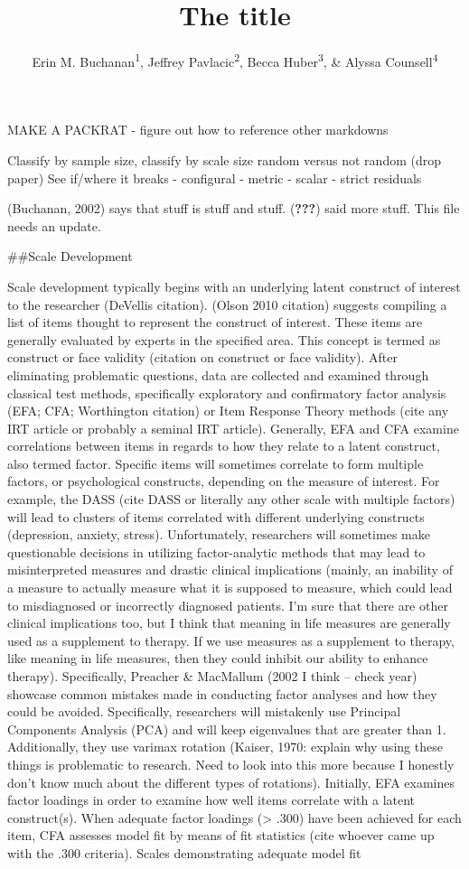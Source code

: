 \documentclass[man,draftall]{apa6}
\title{The title}
\author{Erin M. Buchanan\textsuperscript{1}, Jeffrey Pavlacic\textsuperscript{2}, Becca Huber\textsuperscript{3}, \& Alyssa Counsell\textsuperscript{4}}
\date{}
\affiliation{
\vspace{0.5cm}
\textsuperscript{1} Harrisburg University of Science and Technology\\\textsuperscript{2} University of Mississippi\\\textsuperscript{3} Idaho State University\\\textsuperscript{4} Ryerson University}
\begin{document}
\maketitle

MAKE A PACKRAT
- figure out how to reference other markdowns

Classify by sample size, classify by scale size
random versus not random (drop paper)
See if/where it breaks
- configural
- metric
- scalar
- strict residuals

(Buchanan, 2002) says that stuff is stuff and stuff. ({\textbf{???}}) said more stuff. This file needs an update.

\#\#Scale Development

Scale development typically begins with an underlying latent construct of interest to the researcher (DeVellis citation). (Olson 2010 citation) suggests compiling a list of items thought to represent the construct of interest. These items are generally evaluated by experts in the specified area. This concept is termed as construct or face validity (citation on construct or face validity). After eliminating problematic questions, data are collected and examined through classical test methods, specifically exploratory and confirmatory factor analysis (EFA; CFA; Worthington citation) or Item Response Theory methods (cite any IRT article or probably a seminal IRT article). Generally, EFA and CFA examine correlations between items in regards to how they relate to a latent construct, also termed factor. Specific items will sometimes correlate to form multiple factors, or psychological constructs, depending on the measure of interest. For example, the DASS (cite DASS or literally any other scale with multiple factors) will lead to clusters of items correlated with different underlying constructs (depression, anxiety, stress). Unfortunately, researchers will sometimes make questionable decisions in utilizing factor-analytic methods that may lead to misinterpreted measures and drastic clinical implications (mainly, an inability of a measure to actually measure what it is supposed to measure, which could lead to misdiagnosed or incorrectly diagnosed patients. I'm sure that there are other clinical implications too, but I think that meaning in life measures are generally used as a supplement to therapy. If we use measures as a supplement to therapy, like meaning in life measures, then they could inhibit our ability to enhance therapy). Specifically, Preacher \& MacMallum (2002 I think -- check year) showcase common mistakes made in conducting factor analyses and how they could be avoided. Specifically, researchers will mistakenly use Principal Components Analysis (PCA) and will keep eigenvalues that are greater than 1. Additionally, they use varimax rotation (Kaiser, 1970: explain why using these things is problematic to research. Need to look into this more because I honestly don't know much about the different types of rotations). Initially, EFA examines factor loadings in order to examine how well items correlate with a latent construct(s). When adequate factor loadings (\textgreater{} .300) have been achieved for each item, CFA assesses model fit by means of fit statistics (cite whoever came up with the .300 criteria). Scales demonstrating adequate model fit 
\end{document}

